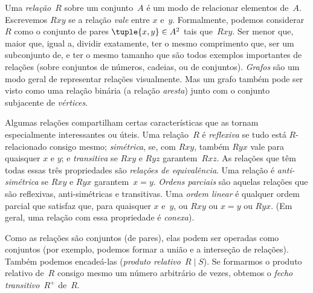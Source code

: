 Uma \emph{relação}~$R$ sobre um conjunto~$A$ é um modo de relacionar elementos
de~$A$. Escrevemos $Rxy$ se a relação \emph{vale} entre $x$
e~$y$. Formalmente, podemos considerar $R$ como o conjunto de pares
$\tuple{x,y} \in A^2$ tais que~$Rxy$. Ser menor que, maior que,
igual a, dividir exatamente, ter o mesmo comprimento que, ser um subconjunto de, e ter o
mesmo tamanho que são todos exemplos importantes de relações (sobre
conjuntos de números, cadeias, ou de conjuntos). \emph{Grafos} são um modo geral
de representar relações visualmente. Mas um grafo também pode ser visto como uma
relação binária (a relação \emph{aresta}) junto com o
conjunto subjacente de \emph{vértices}.

Algumas relações compartilham certas características que as tornam especialmente
interessantes ou úteis. Uma relação~$R$ é \emph{reflexiva} se
tudo está $R$-relacionado consigo mesmo; \emph{simétrica}, se, com $Rxy$,
também $Ryx$ vale para quaisquer $x$ e $y$; e \emph{transitiva} se $Rxy$
e $Ryz$ garantem~$Rxz$. As relações que têm todas essas três
propriedades são \emph{relações de equivalência}. Uma relação é
\emph{anti-simétrica} se $Rxy$ e $Ryx$
garantem~$x=y$. \emph{Ordens parciais} são aquelas relações que são
reflexivas, anti-simétricas e transitivas. Uma \emph{ordem linear} é
qualquer ordem parcial que satisfaz que, para quaisquer $x$ e~$y$, ou
$Rxy$ ou $x=y$ ou $Ryx$. (Em geral, uma relação com essa propriedade é
\emph{conexa}).

Como as relações são conjuntos (de pares), elas podem ser operadas como conjuntos
(por exemplo, podemos formar a união e a interseção de relações). Também podemos
encadeá-las (\emph{produto relativo}~$R \mid S$). Se
formarmos o produto relativo de~$R$ consigo mesmo um número arbitrário de vezes,
obtemos o \emph{fecho transitivo}~$R^+$ de~$R$.
